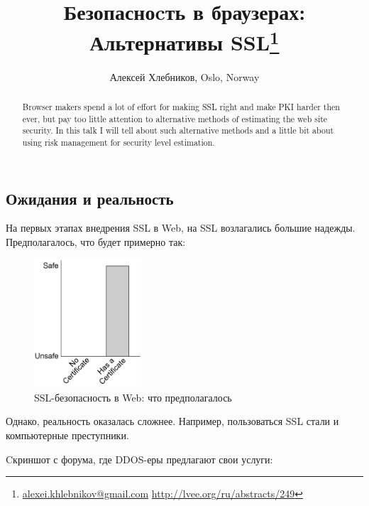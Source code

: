 \documentclass[10pt, a5paper]{article}
\begin{document}
\title{Безопасноcть в браузерах: Альтернативы SSL\footnote{\url{alexei.khlebnikov@gmail.com} \url{http://lvee.org/ru/abstracts/249}}}
\author{Алексей Хлебников, Oslo, Norway}
\maketitle
\begin{abstract}
Browser makers spend a lot of effort for making SSL right and make PKI
harder then ever, but pay too little attention to alternative methods
of estimating the web site security. In this talk I will tell about
such alternative methods and a little bit about using risk management
for security level estimation.
\end{abstract}
\subsection*{Ожидания и реальность}

На первых этапах внедрения SSL в Web, на SSL возлагались большие
надежды. Предполагалось, что будет примерно так:

\begin{center}

\begin{figure}[h!]
  \centering
  \includegraphics[width=4cm]{Hlebnikov1.png}
  \caption{SSL-безопасность в Web: что предполагалось}
  \label{Hlebnikov1}
\end{figure}

\end{center}

Однако, реальность оказалась сложнее. Например, пользоваться SSL стали
и компьютерные преступники.

Cкриншот с форума, где DDOS-еры предлагают свои услуги: 
\end{document}
